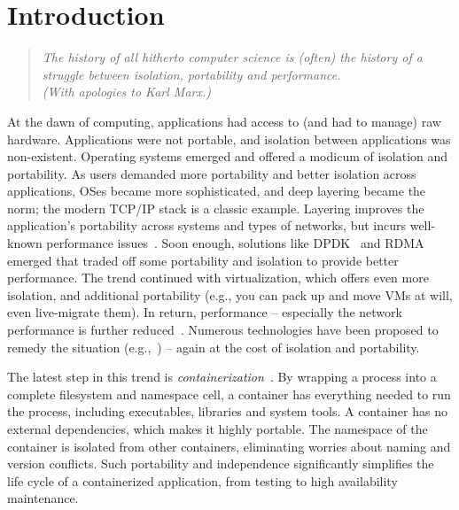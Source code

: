 \section{Introduction} 
\label{sec:introduction}

\begin{quote}
{\em 
The history of all hitherto computer science is (often) the history of a
struggle between isolation, portability and performance. \\ 
(With apologies to Karl Marx.)}
\end{quote}

At the dawn of computing, applications had access to (and had to manage) raw
hardware. Applications were not portable, and isolation between applications was
non-existent. Operating systems emerged and offered a modicum of isolation and
portability. As users demanded more portability and better isolation across
applications, OSes became more sophisticated, and deep layering became the norm;
the modern TCP/IP stack is a classic example.  Layering improves the
application's portability across systems and types of  networks, but incurs
well-known performance issues~\cite{dcqcn,netmap}. Soon enough, solutions
like DPDK~\cite{dpdk} and RDMA~\cite{rdma} emerged that traded off some
portability and isolation to provide better performance.  The trend continued
with virtualization, which offers even more isolation, and additional
portability (e.g., you can pack up and move VMs at will, even live-migrate
them). In return, performance -- especially the network performance is further
reduced~\cite{netvm}. Numerous technologies have been proposed to remedy the
situation (e.g.,~\cite{sriov,netvm,netmap,dpdk}) -- again at the cost of
isolation and portability.

The latest step in this trend is {\em containerization}~\cite{docker,kubernetes,coreos}.  By wrapping
a process into a complete filesystem and namespace cell, a container has
everything needed to run the process, including executables, libraries and
system tools.  A container has no external dependencies, which makes it highly
portable. The namespace of the container is isolated from other containers,
eliminating worries about naming and version conflicts. Such portability and
independence significantly simplifies the life cycle of a containerized
application, from testing to high availability maintenance. 

